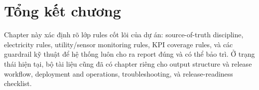 \section{Tổng kết chương}

Chapter này xác định rõ lớp rules cốt lõi của dự án: source-of-truth discipline, electricity rules, utility/sensor monitoring rules, KPI coverage rules, và các guardrail kỹ thuật để hệ thống luôn cho ra report đúng và có thể bảo trì. Ở trạng thái hiện tại, bộ tài liệu cũng đã có chapter riêng cho output structure và release workflow, deployment and operations, troubleshooting, và release-readiness checklist.
